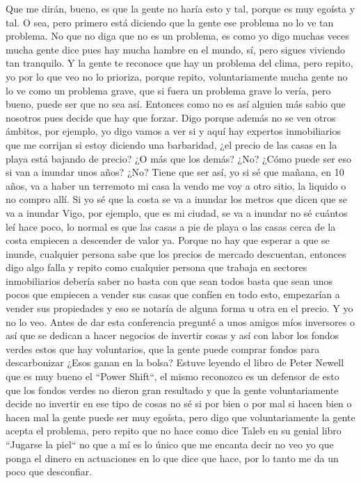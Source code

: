 Que me dirán, bueno, es que la gente no haría esto y tal, porque es muy egoísta y tal. O sea, pero primero está diciendo que la gente ese problema no lo ve tan problema. No que no diga que no es un problema, es como yo digo muchas veces mucha gente dice pues hay mucha hambre en el mundo, sí, pero sigues viviendo tan tranquilo. Y la gente te reconoce que hay un problema del clima, pero repito, yo por lo que veo no lo prioriza, porque repito, voluntariamente mucha gente no lo ve como un problema grave, que si fuera un problema grave lo vería, pero bueno, puede ser que no sea así. Entonces como no es así alguien más sabio que nosotros pues decide que hay que forzar. Digo porque además no se ven otros ámbitos, por ejemplo, yo digo vamos a ver si y aquí hay expertos inmobiliarios que me corrijan si estoy diciendo una barbaridad, ¿el precio de las casas en la playa está bajando de precio? ¿O más que los demás? ¿No? ¿Cómo puede ser eso si van a inundar unos años? ¿No? Tiene que ser así, yo si sé que mañana, en 10 años, va a haber un terremoto mi casa la vendo me voy a otro sitio, la liquido o no compro allí. Si yo sé que la costa se va a inundar los metros que dicen que se va a inundar Vigo, por ejemplo, que es mi ciudad, se va a inundar no sé cuántos leí hace poco, lo normal es que las casas a pie de playa o las casas cerca de la costa empiecen a descender de valor ya. Porque no hay que esperar a que se inunde, cualquier persona sabe que los precios de mercado descuentan, entonces digo algo falla y repito como cualquier persona que trabaja en sectores inmobiliarios debería saber no basta con que sean todos basta que sean unos pocos que empiecen a vender sus casas que confíen en todo esto, empezarían a vender sus propiedades y eso se notaría de alguna forma u otra en el precio. Y yo no lo veo. Antes de dar esta conferencia pregunté a unos amigos míos inversores o así que se dedican a hacer negocios de invertir cosas y así con labor los fondos verdes estos que hay voluntarios, que la gente puede comprar fondos para descarbonizar ¿Esos ganan en la bolsa? Estuve leyendo el libro de Peter Newell que es muy bueno el ``Power Shift``\cite{Newell_2021}, el mismo reconozco es un defensor de esto que los fondos verdes no dieron gran resultado y que la gente voluntariamente decide no invertir en ese tipo de cosas no sé si por bien o por mal si hacen bien o hacen mal la gente puede ser muy egoísta, pero digo que voluntariamente la gente acepta el problema, pero repito que no hace como dice Taleb en su genial libro ``Jugarse la piel``\cite{taleb2018skin} no que a mí es lo único que me encanta decir no veo yo que ponga el dinero en actuaciones en lo que dice que hace, por lo tanto me da un poco que desconfiar. 

